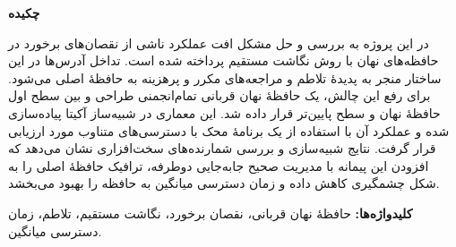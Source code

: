 
\begin{center}
	\textbf{چکیده}
\end{center}
\noindent
در این پروژه به بررسی و حل مشکل افت عملکرد ناشی از نقصان‌های برخورد در حافظه‌های نهان با روش نگاشت مستقیم پرداخته شده است. تداخل آدرس‌ها در این ساختار منجر به پدیدهٔ تلاطم و مراجعه‌های مکرر و پرهزینه به حافظهٔ اصلی می‌شود. برای رفع این چالش، یک حافظهٔ نهان قربانی تمام‌انجمنی طراحی و بین سطح اول حافظهٔ نهان و سطح پایین‌تر قرار داده شد. این معماری در شبیه‌ساز آکیتا پیاده‌سازی شده و عملکرد آن با استفاده از یک برنامهٔ محک با دسترسی‌های متناوب مورد ارزیابی قرار گرفت. نتایج شبیه‌سازی و بررسی شمارنده‌های سخت‌افزاری نشان می‌دهد که افزودن این پیمانه با مدیریت صحیح جابه‌جایی دوطرفه، ترافیک حافظهٔ اصلی را به شکل چشمگیری کاهش داده و زمان دسترسی میانگین به حافظه را بهبود می‌بخشد.

\vspace{\baselineskip}

\noindent\textbf{کلیدواژه‌ها:}
حافظهٔ نهان قربانی، نقصان برخورد، نگاشت مستقیم، تلاطم، زمان دسترسی میانگین.

\newpage